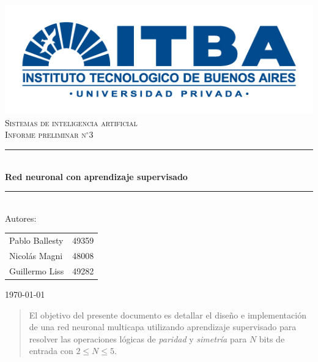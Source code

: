\documentclass{article}
\newcommand{\HRule}{\rule{\linewidth}{0.5mm}}
\begin{document}
\thispagestyle{empty}


\begin{titlepage}
\begin{center}

\Large \  \\[1.5cm]

\includegraphics[scale=0.40]{Imagenes/logo_itba}\\[1cm]
\textsc{\LARGE Sistemas de inteligencia artificial}\\[1.5cm]
\textsc{\Large Informe preliminar $\text{n}^{\circ}$3}\\[0.5cm]

\HRule \\[0.4cm]
{ \huge \bfseries Red neuronal con aprendizaje supervisado}\\[0.4cm]
\HRule \\[1.5cm]

\Large Autores: \\ [0.25cm]
\begin{tabular}{l @{\ \ -\ \ }l}
\Large Pablo Ballesty & \Large 49359\\[0.2cm]
\Large Nicolás Magni & \Large 48008\\[0.2cm]
\Large Guillermo Liss & \Large 49282 \\[0.2cm]
\end{tabular}



\vspace{1cm}

\vfill
{\large \today}

\end{center}
\end{titlepage}


\begin{abstract}
El objetivo del presente documento es detallar el diseño e implementación de una red neuronal multicapa utilizando aprendizaje supervisado
para resolver las operaciones lógicas de \textit{paridad} y \textit{simetría} para $N$ bits de entrada con $2 \le N \le 5$.
\end{abstract}
\end{document}
